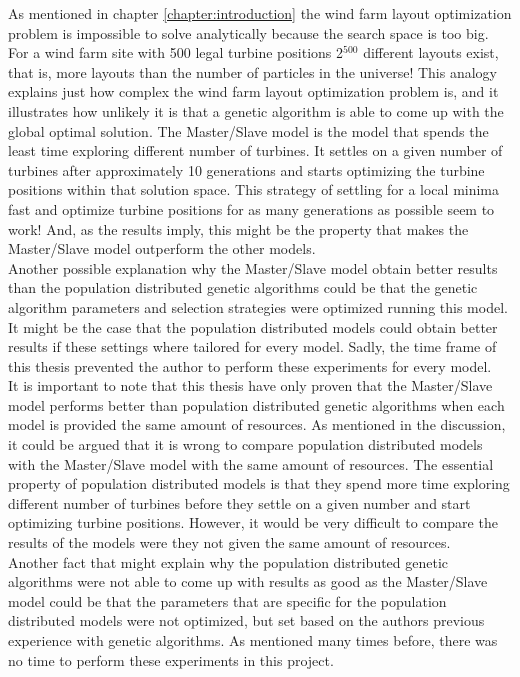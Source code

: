 \noindent As mentioned in chapter \ref{chapter:introduction} the wind farm layout optimization problem is impossible to solve analytically because the search space is too big. For a wind farm site with 500 legal turbine positions 2$^{500}$ different layouts exist, that is, more layouts than the number of particles in the universe! This analogy explains just how complex the wind farm layout optimization problem is, and it illustrates how unlikely it is that a genetic algorithm is able to come up with the global optimal solution. The Master/Slave model is the model that spends the least time exploring different number of turbines. It settles on a given number of turbines after approximately 10 generations and starts optimizing the turbine positions within that solution space. This strategy of settling for a local minima fast and optimize turbine positions for as many generations as possible seem to work! And, as the results imply, this might be the property that makes the Master/Slave  model outperform the other models.\\

\noindent Another possible explanation why the Master/Slave model obtain better results than the population distributed genetic algorithms could be that the genetic algorithm parameters and selection strategies were optimized running this model. It might be the case that the population distributed models could obtain better results if these settings where tailored for every model. Sadly, the time frame of this thesis prevented the author to perform these experiments for every model. \\

\noindent It is important to note that this thesis have only proven that the Master/Slave model performs better than population distributed genetic algorithms when each model is provided the same amount of resources. As mentioned in the discussion, it could be argued that it is wrong to compare population distributed models with the Master/Slave model with the same amount of resources. The essential property of population distributed models is that they spend more time exploring different number of turbines before they settle on a given number and start optimizing turbine positions. However, it would be very difficult to compare the results of the models were they not given the same amount of resources.\\

\noindent Another fact that might explain why the population distributed genetic algorithms were not able to come up with results as good as the Master/Slave model could be that the parameters that are specific for the population distributed models were not optimized, but set based on the authors previous experience with genetic algorithms. As mentioned many times before, there was no time to perform these experiments in this project.\\



